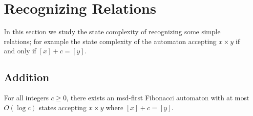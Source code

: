 \documentclass[12pt,reqno]{article}
\begin{document}
\section{Recognizing Relations} \label{section:relations}

In this section we study the state complexity of recognizing some simple relations; for example the state complexity of the automaton accepting $x \times y$ if and only if $[x]+c=[y]$.


\subsection{Addition}

\begin{theorem} \label{theorem:[x]+c=[y]}
    For all integers $c \geq 0$, there exists an msd-first Fibonacci automaton with at most $O(\log  c)$
states accepting $x \times y$ where $[x] + c = [y]$.
\end{theorem}
\end{document}
